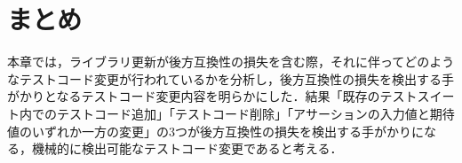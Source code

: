\documentclass[11pt,dvipdfmx]{jreport}
\begin{document}

\section{まとめ}
本章では，ライブラリ更新が後方互換性の損失を含む際，それに伴ってどのようなテストコード変更が行われているかを分析し，後方互換性の損失を検出する手がかりとなるテストコード変更内容を明らかにした．結果「既存のテストスイート内でのテストコード追加」「テストコード削除」「アサーションの入力値と期待値のいずれか一方の変更」の3つが後方互換性の損失を検出する手がかりになる，機械的に検出可能なテストコード変更であると考える．
\end{document}
